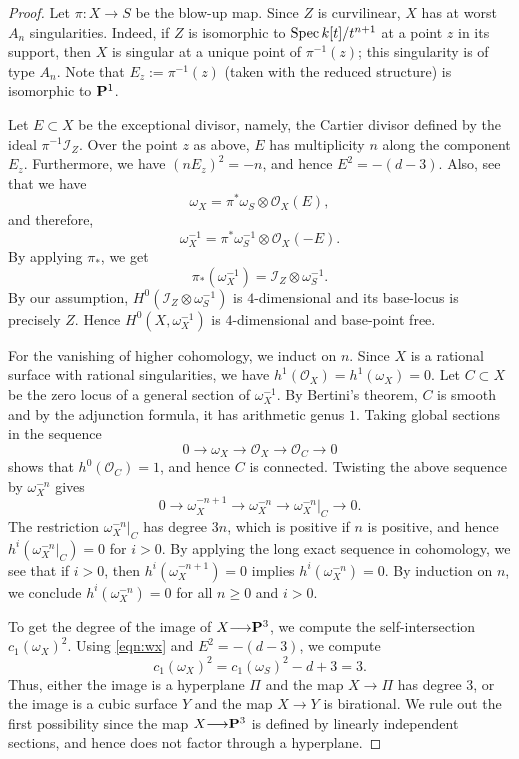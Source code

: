 \documentclass[11pt,reqno, letterpaper]{amsart}
\renewcommand{\to}{{\longrightarrow}}
\numberwithin{equation}{section}
\renewcommand{\O}{\mathcal O}
\begin{document}
\begin{proof}
  Let $\pi \colon X \to S$ be the blow-up map.
  Since $Z$ is curvilinear, $X$ has at worst $A_n$ singularities.
  Indeed, if $Z$ is isomorphic to $\spec k[t]/t^{n+1}$ at a point $z$ in its support, then $X$ is singular at a unique point of $\pi^{-1}(z)$; this singularity is of type $A_n$.
  Note that $E_z := \pi^{-1}(z)$ (taken with the reduced structure) is isomorphic to $\P^1$.
  
  Let $E \subset X$ be the exceptional divisor, namely, the Cartier divisor defined by the ideal $\pi^{-1}\mathcal I_Z$.
  Over the point $z$ as above, $E$ has multiplicity $n$ along the component $E_z$.
  Furthermore, we have $(nE_z)^2 = -n$, and hence $E^2 = -(d-3)$.
  Also, see that we have
  \begin{equation}\label{eqn:wx}
    \omega_X = \pi^* \omega_{S} \otimes \O_X(E),
  \end{equation}
  and therefore,
  \[ \omega_X^{-1} = \pi^* \omega^{-1}_{S} \otimes \O_X(-E).\]
  By applying $\pi_*$, we get
  \[ \pi_* \left( \omega_X^{-1} \right) = \mathcal I_Z \otimes \omega_S^{-1}.\]
  By our assumption, $H^0\left(\mathcal I_Z \otimes \omega_S^{-1}\right)$ is $4$-dimensional and its base-locus is precisely $Z$.
  Hence $H^0\left( X, \omega_X^{-1} \right)$ is $4$-dimensional and base-point free.

  For the vanishing of higher cohomology, we induct on $n$.
  Since $X$ is a rational surface with rational singularities, we have $h^1(\O_X) = h^1(\omega_X) = 0$.
  Let $C \subset X$ be the zero locus of a general section of $\omega_X^{-1}$.
  By Bertini's theorem, $C$ is smooth and by the adjunction formula, it has arithmetic genus $1$.
  Taking global sections in the sequence
  \[ 0 \to \omega_X \to \O_X \to \O_C \to 0\]
  shows that $h^0(\O_C) = 1$, and hence $C$ is connected.
  Twisting the above sequence by $\omega_X^{-n}$ gives
  \[ 0 \to \omega_X^{-n+1} \to \omega_X^{-n} \to \omega_X^{-n}|_C \to 0.\]
  The restriction $\omega_X^{-n}|_C$ has degree $3n$, which is positive if $n$ is positive, and hence $h^i\left(\omega_X^{-n}|_C\right) = 0$ for $i > 0$.
  By applying the long exact sequence in cohomology, we see that if $i > 0$, then $h^i(\omega_X^{-n+1}) = 0$ implies $h^i(\omega_X^{-n}) = 0$.
  By induction on $n$, we conclude $h^i(\omega_X^{-n}) = 0$ for all $n \geq 0$ and $i > 0$.
    
  To get the degree of the image of $X \to \P^3$, we compute the self-intersection $c_1(\omega_X)^2$.
  Using \eqref{eqn:wx} and $E^2 = -(d-3)$, we compute
  \[ c_1(\omega_X)^2 = c_1(\omega_{S})^2 - d + 3 = 3.\]
  Thus, either the image is a hyperplane $\Pi$ and the map $X \to \Pi$ has degree 3, or the image is a cubic surface $Y$ and the map $X \to Y$ is birational.
  We rule out the first possibility since the map $X \to \P^3$ is defined by linearly independent sections, and hence does not factor through a hyperplane.


\end{proof}
\end{document}
